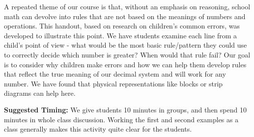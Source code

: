 \documentclass[nooutcomes]{ximera}
\begin{document}
\newpage
\begin{instructorNotes}
A repeated theme of our course is that, without an emphasis on reasoning, school math can devolve into rules that are not based on the meanings of numbers and operations.  This handout, based on research on children's common errors, was developed to illustrate this point.  We have students examine each line from a child's point of view - what would be the most basic rule/pattern they could use to correctly decide which number is greater? When would that rule fail? Our goal is to consider why children make errors and how we can help them develop rules that reflect the true meaning of our decimal system and will work for any number.  We have found that physical representations like blocks or strip diagrams can help here.


{\bf Suggested Timing:} We give students 10 minutes in groups, and then spend 10 minutes in whole class discussion.  Working the first and second examples as a class generally makes this activity quite clear for the students.
\end{instructorNotes}
\end{document}
